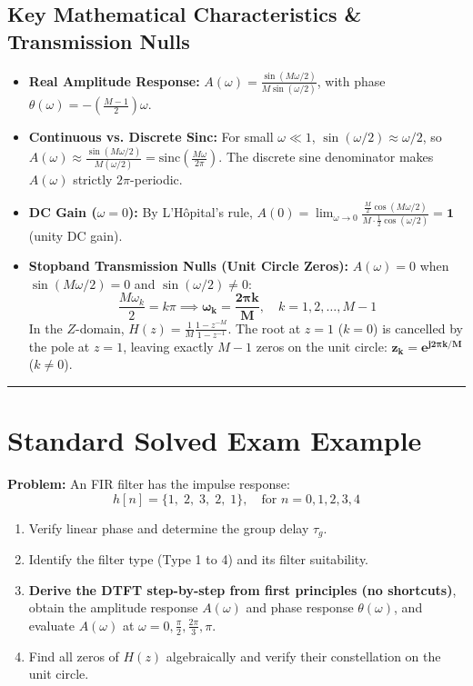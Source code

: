 \documentclass[11pt,a4paper]{article}
\begin{document}
\subsection{Key Mathematical Characteristics \& Transmission Nulls}
\begin{itemize}
    \item \textbf{Real Amplitude Response:} $A(\omega) = \frac{\sin(M\omega/2)}{M\sin(\omega/2)}$, with phase $\theta(\omega) = -\left(\frac{M-1}{2}\right)\omega$.
    \item \textbf{Continuous vs. Discrete Sinc:} For small $\omega \ll 1$, $\sin(\omega/2) \approx \omega/2$, so $A(\omega) \approx \frac{\sin(M\omega/2)}{M(\omega/2)} = \text{sinc}\left(\frac{M\omega}{2\pi}\right)$. The discrete sine denominator makes $A(\omega)$ strictly $2\pi$-periodic.
    \item \textbf{DC Gain ($\omega = 0$):} By L'Hôpital's rule, $A(0) = \lim_{\omega \to 0} \frac{\frac{M}{2}\cos(M\omega/2)}{M \cdot \frac{1}{2}\cos(\omega/2)} = \mathbf{1}$ (unity DC gain).
    \item \textbf{Stopband Transmission Nulls (Unit Circle Zeros):} $A(\omega) = 0$ when $\sin(M\omega/2) = 0$ and $\sin(\omega/2) \ne 0$:
    \begin{equation}
    \frac{M\omega_k}{2} = k\pi \implies \mathbf{\omega_k = \frac{2\pi k}{M}}, \quad k = 1, 2, \dots, M-1
    \end{equation}
    In the $Z$-domain, $H(z) = \frac{1}{M}\frac{1 - z^{-M}}{1 - z^{-1}}$. The root at $z = 1$ ($k=0$) is cancelled by the pole at $z=1$, leaving exactly $M-1$ zeros on the unit circle: $\mathbf{z_k = e^{j 2\pi k / M}}$ ($k \ne 0$).
\end{itemize}

\noindent\rule{\textwidth}{0.5pt}

\section{Standard Solved Exam Example}

\textbf{Problem:} An FIR filter has the impulse response:
\begin{equation}
h[n] = \{1, \; 2, \; 3, \; 2, \; 1\}, \quad \text{for } n = 0, 1, 2, 3, 4
\end{equation}
\begin{enumerate}
    \item Verify linear phase and determine the group delay $\tau_g$.
    \item Identify the filter type (Type 1 to 4) and its filter suitability.
    \item \textbf{Derive the DTFT step-by-step from first principles (no shortcuts)}, obtain the amplitude response $A(\omega)$ and phase response $\theta(\omega)$, and evaluate $A(\omega)$ at $\omega = 0, \frac{\pi}{2}, \frac{2\pi}{3}, \pi$.
    \item Find all zeros of $H(z)$ algebraically and verify their constellation on the unit circle.
\end{enumerate}
\end{document}
